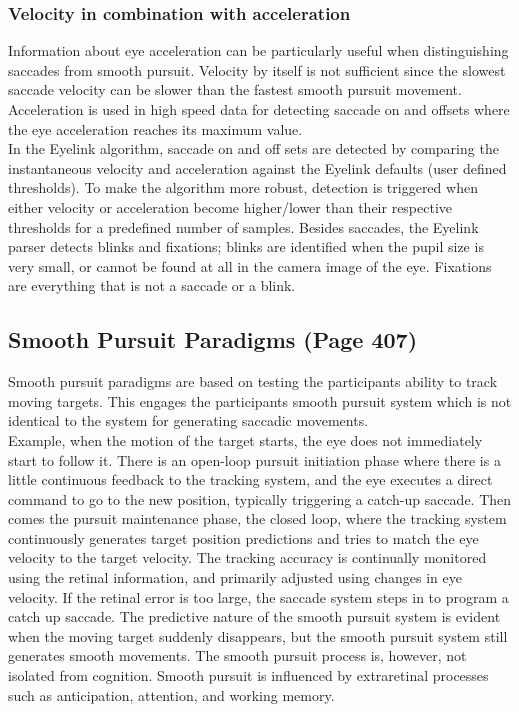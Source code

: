 \documentclass[12pt]{article}
\theoremstyle{definition}
\begin{document}
\subsubsection{Velocity in combination with acceleration}
Information about eye acceleration can be particularly useful when distinguishing saccades from smooth pursuit. Velocity by itself is not sufficient since the slowest saccade velocity can be slower than the fastest smooth pursuit movement. Acceleration is used in high speed data for detecting saccade on and offsets where the eye acceleration reaches its maximum value.\\

In the Eyelink algorithm, saccade on and off sets are detected by comparing the instantaneous velocity and acceleration against the Eyelink defaults (user defined thresholds). To make the algorithm more robust, detection is triggered when either velocity or acceleration become higher/lower than their respective thresholds for a predefined number of samples. Besides saccades, the Eyelink parser detects blinks and fixations; blinks are identified when the pupil size is very small, or cannot be found at all in the camera image of the eye. Fixations are everything that is not a saccade or a blink.

\newpage
\subsection{Smooth Pursuit Paradigms (Page 407)}
Smooth pursuit paradigms are based on testing the participants ability to track moving targets. This engages the participants smooth pursuit system which is not identical to the system for generating saccadic movements.\\

Example, when the motion of the target starts, the eye does not immediately start to follow it. There is an open-loop pursuit initiation phase where there is a little continuous feedback to the tracking system, and the eye executes a direct command to go to the new position, typically triggering a catch-up saccade. Then comes the pursuit maintenance phase, the closed loop, where the tracking system continuously generates target position predictions and tries to match the eye velocity to the target velocity. The tracking accuracy is continually monitored using the retinal information, and primarily adjusted using changes in eye velocity. If the retinal error is too large, the saccade system steps in to program a catch up saccade. The predictive nature of the smooth pursuit system is evident when the moving target suddenly disappears, but the smooth pursuit system still generates smooth movements. The smooth pursuit process is, however, not isolated from cognition. Smooth pursuit is influenced by extraretinal processes such as anticipation, attention, and working memory. \\
\end{document}
